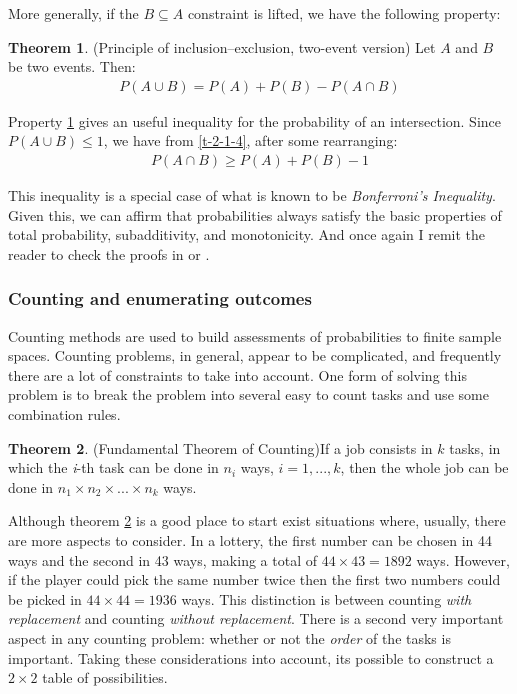 \documentclass[
  oneside,
  11pt, a4paper,
  footinclude=true,
  headinclude=true,
  cleardoublepage=empty
]{scrbook}
\theoremstyle{definition}
\theoremstyle{definition}
\newtheorem{theorem}{Theorem}[section]
\begin{document}
            More generally, if the $B \subseteq A$ constraint is lifted, we have the following property:
            \begin{theorem}{(Principle of inclusion–exclusion, two-event version) Let $A$ and $B$ be two events. Then:}\label{2-1-4}
                \begin{align}\label{t-2-1-4}
                    P(A \cup B) = P(A) + P(B) - P(A \cap B)
                \end{align}{}
            \end{theorem}
            
            Property \ref{2-1-4} gives an useful inequality for the probability of an intersection. Since $P(A \cup B) \leq 1$, we have from \ref{t-2-1-4}, after some rearranging:
            \begin{align}\label{al-6}
                P(A \cap B) \geq P(A) + P(B) - 1
            \end{align}{}
            
            This inequality is a special case of what is known to be \emph{Bonferroni's Inequality}.
            Given this, we can affirm that probabilities always satisfy the basic properties of total probability, subadditivity, and monotonicity. And once again I remit the reader to check the proofs in \cite{CaseBerg:01} or \cite{RePEc:bes:amstat:v:59:y:2005:m:august:p:276-276}.
            
        \subsubsection{Counting and enumerating outcomes}
        
        Counting methods are used to build assessments of probabilities to finite sample spaces. Counting problems, in general, appear to be complicated, and frequently there are a lot of constraints to take into account. One form of solving this problem is to break the problem into several easy to count tasks and use some combination rules.
        
        \begin{theorem}{(Fundamental Theorem of Counting)}\label{t-2-1-5}
            If a job consists in $k$ tasks, in which the \emph{i}-th task can be done in $n_i$ ways, $i = 1,...,k$, then the whole job can be done in $n_1 \times n_2 \times ... \times n_k$ ways.
        \end{theorem}{}
        
        Although theorem \ref{t-2-1-5} is a good place to start exist situations where, usually, there are more aspects to consider. In a lottery, the first number can be chosen in 44 ways and the second in 43 ways, making a total of $44 \times 43 = 1892$ ways. However, if the player could pick the same number twice then the first two numbers could be picked in $44 \times 44 = 1936$ ways. This distinction is between counting \emph{with replacement} and counting \emph{without replacement}. There is a second very important aspect in any counting problem: whether or not the \emph{order} of the tasks is important. Taking these considerations into account, its possible to construct a $2 \times 2$ table of possibilities.
        
\end{document}
